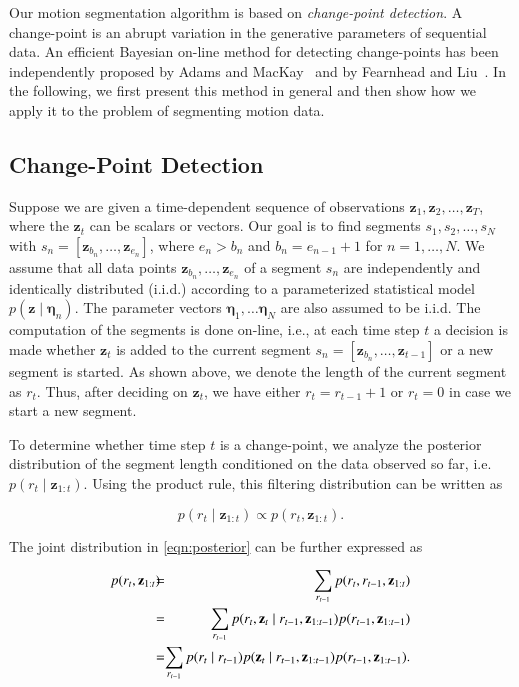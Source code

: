 Our motion segmentation algorithm is based on \emph{change-point detection}. A
change-point is an abrupt variation in the generative parameters of sequential
data. An efficient Bayesian on-line method for detecting change-points has been
independently proposed by Adams and MacKay~\cite{adams07bayesian} and by
Fearnhead and Liu~\cite{fearnhead07online}. In the following, we first present
this method in general and then show how we apply it to the problem of
segmenting motion data.

\subsection{Change-Point Detection}
Suppose we are given a time-dependent sequence of observations $\mathbf{z}_1,
\mathbf{z}_2, \dots,\mathbf{z}_T$, where the $\mathbf{z}_t$ can be scalars or
vectors. Our goal is to find segments $s_1,s_2,\dots,s_N$ with
$s_n=[\mathbf{z}_{b_n},\dots,\mathbf{z}_{e_n}]$, where $e_n > b_n$ and
$b_n = e_{n-1}+1$ for $n=1,\dots,N$. We assume that all data points
$\mathbf{z}_{b_n},\dots,\mathbf{z}_{e_n}$ of a segment $s_n$ are independently
and identically distributed (i.i.d.) according to a parameterized statistical
model \mbox{$p(\mathbf{z}\mid \boldsymbol{\eta}_n)$}. The parameter vectors
$\boldsymbol{\eta}_1,\dots \boldsymbol{\eta}_N$ are also assumed to be i.i.d.
The computation of the segments is done on-line, i.e., at each time step $t$ a
decision is made whether $\mathbf{z}_t$ is added to the current segment
$s_n=[\mathbf{z}_{b_n},\dots,\mathbf{z}_{t-1}]$ or a new segment is started. As
shown above, we denote the length of the current segment as $r_t$. Thus, after
deciding on $\mathbf{z}_t$, we have either $r_t=r_{t-1}+1$ or $r_t=0$ in case we
start a new segment.

To determine whether time step $t$ is a change-point, we analyze the posterior
distribution of the segment length conditioned on the data observed so far,
i.e. $p(r_t\mid \mathbf{z}_{1:t})$. Using the product rule, this filtering
distribution can be written as

\begin{equation}
\label{eqn:posterior}
p(r_t\mid \mathbf{z}_{1:t})\propto p(r_t,\mathbf{z}_{1:t}).
\end{equation}

The joint distribution in \eqref{eqn:posterior} can be further expressed as

\begin{eqnarray}
\label{eqn:joint}
p(r_t,\mathbf{z}_{1:t})\hspace{-0.2cm}&=& \hspace{-0.35cm}\sum_{r_{t-1}}p(r_t,
r_{t-1},\mathbf{z}_{1:t})\nonumber\\
&=&\hspace{-0.35cm}\sum_{r_{t-1}}p(r_t,\mathbf{z}_t\mid r_{t-1},
\mathbf{z}_{1:t-1})p(r_{t-1},\mathbf{z}_{1:t-1})\nonumber\\
&=&\hspace{-0.35cm}\sum_{r_{t-1}}p(r_t\mid r_{t-1})p(\mathbf{z}_t\mid r_{t-1},
\mathbf{z}_{1:t-1})p(r_{t-1},\mathbf{z}_{1:t-1}).
\end{eqnarray}

